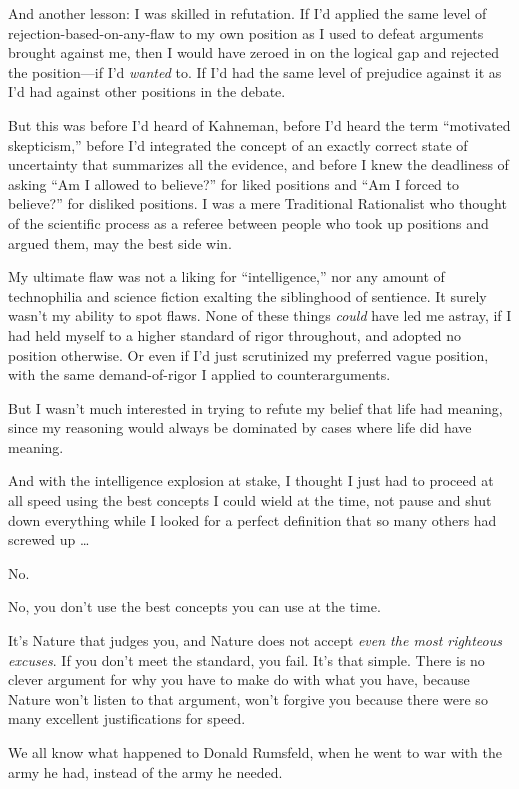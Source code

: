 {
 And another lesson: I was skilled in refutation. If
I'd applied the same level of
rejection-based-on-any-flaw to my own position as I used to defeat
arguments brought against me, then I would have zeroed in on the
logical gap and rejected the position---if I'd
\textit{wanted} to. If I'd had the same level of
prejudice against it as I'd had against other positions
in the debate.}

{
 But this was before I'd heard of Kahneman, before
I'd heard the term ``motivated
skepticism,'' before I'd integrated
the concept of an exactly correct state of uncertainty that summarizes
all the evidence, and before I knew the deadliness of asking
``Am I allowed to believe?'' for
liked positions and ``Am I forced to
believe?'' for disliked positions. I was a mere
Traditional Rationalist who thought of the scientific process as a
referee between people who took up positions and argued them, may the
best side win.}

{
 My ultimate flaw was not a liking for
``intelligence,'' nor any amount of
technophilia and science fiction exalting the siblinghood of sentience.
It surely wasn't my ability to spot flaws. None of
these things \textit{could} have led me astray, if I had held myself to
a higher standard of rigor throughout, and adopted no position
otherwise. Or even if I'd just scrutinized my preferred
vague position, with the same demand-of-rigor I applied to
counterarguments.}

{
 But I wasn't much interested in trying to refute
my belief that life had meaning, since my reasoning would always be
dominated by cases where life did have meaning.}

{
 And with the intelligence explosion at stake, I thought I just had
to proceed at all speed using the best concepts I could wield at the
time, not pause and shut down everything while I looked for a perfect
definition that so many others had screwed up \ldots}

{
 No.}

{
 No, you don't use the best concepts you can use at
the time.}

{
 It's Nature that judges you, and Nature does not
accept \textit{even the most righteous excuses}. If you
don't meet the standard, you fail. It's
that simple. There is no clever argument for why you have to make do
with what you have, because Nature won't listen to that
argument, won't forgive you because there were so many
excellent justifications for speed.}

{
 We all know what happened to Donald Rumsfeld, when he went to war
with the army he had, instead of the army he needed.}

